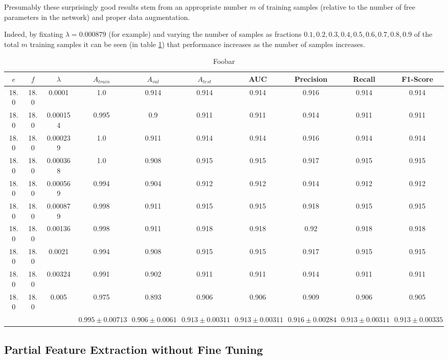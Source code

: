 Presumably these surprisingly good results stem from an appropriate number $m$ of training samples (relative to the number of free parameters in the network) and proper data augmentation.

Indeed, by fixating $\lambda = 0.000879$ (for example) and varying the number of samples as fractions ${0.1, 0.2, 0.3, 0.4, 0.5, 0.6, 0.7, 0.8, 0.9}$ of the total $m$ training samples it can be seen (in table \ref{table:vgg16_total_debug}) that performance increases as the number of samples increases.

\begin{table}[ht]
\centering
\begin{tabular}{ |c|c|c|c|c|c|c|c|c|c| }
\hline
$e$ & $f$ & $\lambda$ & $A_{train}$ & $A_{val}$ & $A_{test}$ & AUC & Precision & Recall & F1-Score \\
\hline
18.0 & 18.0 & 0.0001 & 1.0 & 0.914 & 0.914 & 0.914 & 0.916 & 0.914 & 0.914 \\
18.0 & 18.0 & 0.000154 & 0.995 & 0.9 & 0.911 & 0.911 & 0.914 & 0.911 & 0.911 \\
18.0 & 18.0 & 0.000239 & 1.0 & 0.911 & 0.914 & 0.914 & 0.916 & 0.914 & 0.914 \\
18.0 & 18.0 & 0.000368 & 1.0 & 0.908 & 0.915 & 0.915 & 0.917 & 0.915 & 0.915 \\
18.0 & 18.0 & 0.000569 & 0.994 & 0.904 & 0.912 & 0.912 & 0.914 & 0.912 & 0.912 \\
18.0 & 18.0 & 0.000879 & 0.998 & 0.911 & 0.915 & 0.915 & 0.918 & 0.915 & 0.915 \\
18.0 & 18.0 & 0.00136 & 0.998 & 0.911 & 0.918 & 0.918 & 0.92 & 0.918 & 0.918 \\
18.0 & 18.0 & 0.0021 & 0.994 & 0.908 & 0.915 & 0.915 & 0.917 & 0.915 & 0.915 \\
18.0 & 18.0 & 0.00324 & 0.991 & 0.902 & 0.911 & 0.911 & 0.914 & 0.911 & 0.911 \\
18.0 & 18.0 & 0.005 & 0.975 & 0.893 & 0.906 & 0.906 & 0.909 & 0.906 & 0.905 \\
\hline
 & & & $0.995\pm0.00713$ & $0.906\pm0.0061$ & $0.913\pm0.00311$ & $0.913\pm0.00311$ & $0.916\pm0.00284$ & $0.913\pm0.00311$ & $0.913\pm0.00335$ \\
\hline
\end{tabular}
\caption{Foobar}
\label{table:vgg16_total_debug}
\end{table}

\subsection{Partial Feature Extraction without Fine Tuning}

